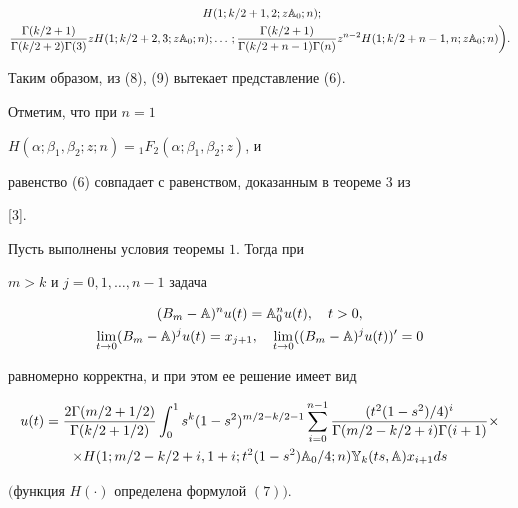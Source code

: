 \begin{pf}
\begin{multline*}
\ H(1;k/2+1,2;z\Bbb A_0;n);\\ 


% 


\frac{\Gamma(k/2+1)}{\Gamma(k/2+2)\Gamma(3)} 


z H(1;k/2+2,3;z\Bbb A_0;n);\dotsc; 


\frac{\Gamma(k/2+1)}{\Gamma(k/2+n-1)\Gamma(n)} 


z^{n-2}H(1;k/2+n-1,n;z\Bbb A_0;n)\bigg). 


\end{multline*} 


 


Таким образом, из (8), (9) вытекает представление (6).  


 


Отметим, что при $n=1$\; 


$H(\alpha;\beta_1,\beta_2;z;n)={}_1F_2(\alpha;\beta_1,\beta_2;z)$, и 


равенство (6) совпадает с равенством, доказанным в теореме 3 из 


[3]. 


\end{pf} 


 


\begin{thm} Пусть выполнены условия теоремы $1$. Тогда при 


$m>k$ и $j=0,1,\dotsc,n-1$ задача 


\begin{gather} 


(B_m-\Bbb A)^n u(t)=\Bbb A^n_0 u(t),\quad t>0, \\ 


\lim_{t\to 0}(B_m-\Bbb A)^j u(t)=x_{j+1},\quad 


\lim_{t\to 0}((B_m-\Bbb A)^j u(t))'=0 


\end{gather} 


равномерно корректна, и при этом ее решение имеет вид 


\begin{multline} 


u(t)=\frac{2\Gamma(m/2+1/2)}{\Gamma(k/2+1/2)} 


\int^1_0 s^k(1-s^2)^{m/2-k/2-1}\sum^{n-1}_{i=0} 


\frac{(t^2(1-s^2)/4)^i}{\Gamma(m/2-k/2+i)\Gamma(i+1)}\times \\ 


% 


\times H(1;m/2-k/2+i,1+i;t^2(1-s^2)\Bbb A_0/4;n) 


\Bbb Y_k(ts,\Bbb A)x_{i+1}ds 


\end{multline} 


$($функция $H(\cdot)$ определена формулой $(7))$.  


\end{thm} 


